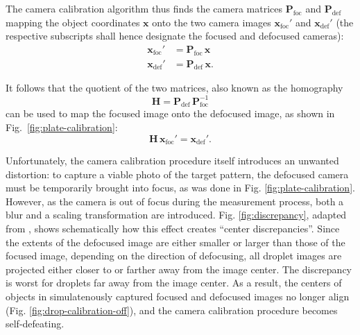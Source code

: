 \documentclass[preprint]{elsarticle}
\begin{document}
The camera calibration algorithm thus finds the camera matrices
$\mathbf{P}_\text{foc}$ and $\mathbf{P}_\text{def}$ mapping the
object coordinates $\mathbf{x}$ onto the two camera images
$\mathbf{x}_\text{foc}'$ and $\mathbf{x}_\text{def}'$ (the respective 
    subscripts shall hence designate the focused and defocused
    cameras):
\begin{align}
    \mathbf{x}_\text{foc}' &= \mathbf{P}_\text{foc} \, \mathbf{x} \\
    \mathbf{x}_\text{def}' &= \mathbf{P}_\text{def} \, \mathbf{x}.
\end{align}

It follows that the quotient of the two matrices, also known as the homography
\begin{equation}
    \mathbf{H} = \mathbf{P}_\text{def} \, \mathbf{P}_\text{foc}^{-1}
\end{equation}
can be used to map the focused image onto the defocused image, as shown in Fig.~\ref{fig:plate-calibration}:
\begin{equation}
    \mathbf{H}\, \mathbf{x}_\text{foc}' = \mathbf{x}_\text{def}'.
    \label{homography-definition}
\end{equation}

Unfortunately, the camera calibration procedure itself introduces an unwanted
distortion: to capture a viable photo of the target pattern, the defocused
camera must be temporarily brought into focus, as was done in
Fig. \ref{fig:plate-calibration}. However, as the camera is out of focus during
the measurement process, both a blur and a scaling transformation are
introduced.
 Fig. \ref{fig:discrepancy}, adapted from \citet{Hardalupas10},
shows schematically how this effect creates ``center discrepancies''. Since the
extents of the defocused image are either smaller or larger than those of the
focused image, depending on the direction of defocusing, all droplet images are
projected either closer to or farther away from the image center. The
discrepancy is worst for droplets far away from the image center. As a result,
the centers of objects in simulatenously captured focused and defocused images
no longer align (Fig. \ref{fig:drop-calibration-off}), and the camera calibration
procedure becomes self-defeating.
\end{document}
